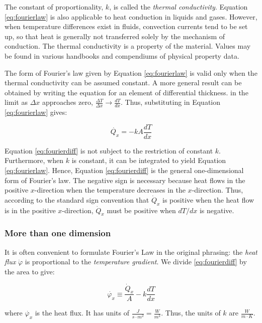 The constant of proportionality, $k$, is called the \emph{thermal conductivity}. Equation \eqref{eq:fourierlaw} is also applicable to heat conduction in liquids and gases. However, when temperature differences exist in fluids, convection currents tend to be set up, so that heat is generally not transferred solely by the mechanism of conduction. The thermal conductivity is a property of the material. Values may be found in various handbooks and compendiums of physical property data.

The form of Fourier’s law given by Equation \eqref{eq:fourierlaw} is valid only when the thermal conductivity can be assumed constant. A more general result can be obtained by writing the equation for an element of differential thickness. in the limit as $\Delta x$ approaches zero, $\frac{\Delta T}{\Delta x} \rightarrow \frac{d T}{d x}$. Thus, substituting in Equation \eqref{eq:fourierlaw} gives:

\begin{equation}
	\label{eq:fourierdiff}
	\dot{Q_x} = - kA \frac{d T}{d x}
\end{equation}

Equation \eqref{eq:fourierdiff} is not subject to the restriction of constant $k$. Furthermore, when $k$ is constant, it can be integrated to yield Equation \eqref{eq:fourierlaw}. Hence, Equation \eqref{eq:fourierdiff} is the general one-dimensional form of Fourier’s law. The negative sign is necessary because heat flows in the positive $x$-direction when the temperature decreases in the $x$-direction. Thus, according to the standard sign convention that
$\dot Q_x$ is positive when the heat flow is in the positive $x$-direction, $\dot Q_x$ must be positive when $dT/dx$ is negative. 

\subsubsection{More than one dimension}

It is often convenient to formulate Fourier's Law in the original phrasing: the \emph{heat flux} $ \dot{\varphi}$  is proportional to the \emph{temperature gradient}. We divide \eqref{eq:fourierdiff} by the area to give:

\begin{equation}
	\label{eq:fourierflux}
	\dot{\varphi_x} \equiv \frac{\dot Q_x}{A}- k \frac{d T}{d x}
\end{equation}

where $\dot{\varphi_x}$ is the heat flux. It has units of $\frac{J}{s \cdot m^2} = \frac{W}{m^2}$. 
Thus, the units of $k$ are $\frac{W}{m \cdot K}$.

